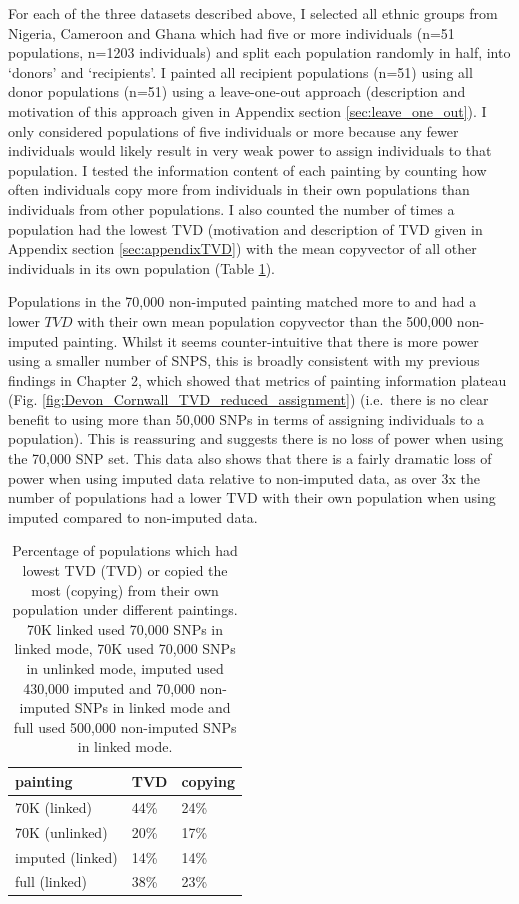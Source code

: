 For each of the three datasets described above, I selected all ethnic groups from Nigeria, Cameroon and Ghana which had five or more individuals (n=51 populations, n=1203 individuals) and split each population randomly in half, into `donors' and `recipients'. I painted all recipient populations (n=51) using all donor populations (n=51) using a leave-one-out approach (description and motivation of this approach given in Appendix section \ref{sec:leave_one_out}). I only considered populations of five individuals or more because any fewer individuals would likely result in very weak power to assign individuals to that population. I tested the information content of each painting by counting how often individuals copy more from individuals in their own populations than individuals from other populations. I also counted the number of times a population had the lowest TVD (motivation and description of TVD given in Appendix section \ref{sec:appendixTVD}) with the mean copyvector of all other individuals in its own population (Table \ref{table:TVD_copying}).

Populations in the 70,000 non-imputed painting matched more to and had a lower $TVD$ with their own mean population copyvector than the 500,000 non-imputed painting. Whilst it seems counter-intuitive that there is more power using a smaller number of SNPS, this is broadly consistent with my previous findings in Chapter 2, which showed that metrics of painting information plateau (Fig. \ref{fig:Devon_Cornwall_TVD_reduced_assignment}) (i.e.\ there is no clear benefit to using more than 50,000 SNPs in terms of assigning individuals to a population). This is reassuring and suggests there is no loss of power when using the 70,000 SNP set. This data also shows that there is a fairly dramatic loss of power when using imputed data relative to non-imputed data, as over 3x the number of populations had a lower TVD with their own population when using imputed compared to non-imputed data.

\begin{table}
\centering
\small
\begin{tabular}{l|l|l}
\toprule
painting & TVD & copying\\
\midrule
70K (linked) & 44\% & 24\%\\
70K (unlinked) & 20\% & 17\%\\
imputed (linked) & 14\% & 14\%\\
full (linked) & 38\% & 23\%\\
\bottomrule
\end{tabular}
\caption{Percentage of populations which had lowest TVD (TVD) or copied the most (copying) from their own population under different paintings. 70K linked used 70,000 SNPs in linked mode, 70K used 70,000 SNPs in unlinked mode, imputed used 430,000 imputed and 70,000 non-imputed SNPs in linked mode and full used 500,000 non-imputed SNPs in linked mode.}
\label{table:TVD_copying}
\end{table}

